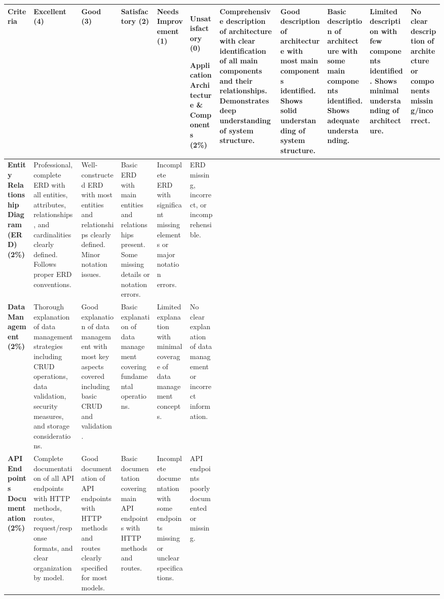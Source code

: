 \documentclass{article}
\begin{document}
\renewcommand{\arraystretch}{1.2}
\begin{longtable}{|L{3cm}|L{2.2cm}|L{2.2cm}|L{2.2cm}|L{2.2cm}|L{2.2cm}|}
\hline
\textbf{Criteria} & \textbf{Excellent (4)} & \textbf{Good (3)} & \textbf{Satisfactory (2)} & \textbf{Needs Improvement (1)} & \textbf{Unsatisfactory (0)} \ \hline
\endhead

\textbf{Application Architecture \& Components (2\%)} & 
Comprehensive description of architecture with clear identification of all main components and their relationships. Demonstrates deep understanding of system structure. & 
Good description of architecture with most main components identified. Shows solid understanding of system structure. & 
Basic description of architecture with some main components identified. Shows adequate understanding. & 
Limited description with few components identified. Shows minimal understanding of architecture. & 
No clear description of architecture or components missing/incorrect. \\ \hline

\textbf{Entity Relationship Diagram (ERD) (2\%)} & 
Professional, complete ERD with all entities, attributes, relationships, and cardinalities clearly defined. Follows proper ERD conventions. & 
Well-constructed ERD with most entities and relationships clearly defined. Minor notation issues. & 
Basic ERD with main entities and relationships present. Some missing details or notation errors. & 
Incomplete ERD with significant missing elements or major notation errors. & 
ERD missing, incorrect, or incomprehensible. \\ \hline

\textbf{Data Management (2\%)} & 
Thorough explanation of data management strategies including CRUD operations, data validation, security measures, and storage considerations. & 
Good explanation of data management with most key aspects covered including basic CRUD and validation. & 
Basic explanation of data management covering fundamental operations. & 
Limited explanation with minimal coverage of data management concepts. & 
No clear explanation of data management or incorrect information. \\ \hline

\textbf{API Endpoints Documentation (2\%)} & 
Complete documentation of all API endpoints with HTTP methods, routes, request/response formats, and clear organization by model. & 
Good documentation of API endpoints with HTTP methods and routes clearly specified for most models. & 
Basic documentation covering main API endpoints with HTTP methods and routes. & 
Incomplete documentation with some endpoints missing or unclear specifications. & 
API endpoints poorly documented or missing. \\ \hline


\end{longtable}
\end{document}
